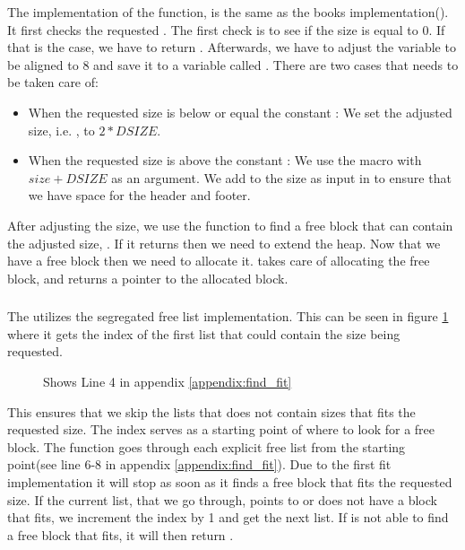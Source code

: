 The implementation of the  function, is the same as the books implementation(\cite[ch. 9.9.12]{csapp-mem}).
It first checks the requested . The first check is to see if the size is equal to 0. If that is the case, we have to return .
Afterwards, we have to adjust the variable  to be aligned to 8 and save it to a variable called . 
There are two cases that needs to be taken care of:
\begin{itemize}
    \item When the requested size is below or equal the constant : We set the adjusted size, i.e. , to $2 * DSIZE$.
    \item When the requested size is above the constant : We use the  macro with $size + DSIZE$ as an argument. We add  to the size as input
    in  to ensure that we have space for the header and footer.
\end{itemize}

After adjusting the size, we use the  function to find a free block that can contain the adjusted size, . If it returns  then we need to extend the
heap. 
Now that we have a free block then we need to allocate it. 
 takes care of allocating the free block, and returns a pointer to the allocated block.

\subsubsection{}

The  utilizes the segregated free list implementation.
This can be seen in figure \ref{fig:get-list-index} where it gets the index of the first list that could contain the size being requested.
\begin{figure}[h]
    \centering
    \caption{Shows Line 4 in appendix \ref{appendix:find_fit}}
    \label{fig:get-list-index}
\end{figure}
This ensures that we skip the lists that does not contain sizes that fits the requested size. The index serves as a starting point
of where to look for a free block. The function goes through each explicit free list from the starting point(see line 6-8 in appendix \ref{appendix:find_fit}).
Due to the first fit implementation it will stop as soon as it finds a free block that fits the requested size. 
If the current list, that we go through, points to  or does not have a block that fits, we increment the index by 1 and get the next list.
If  is not able to find a free block that fits, it will then return .

